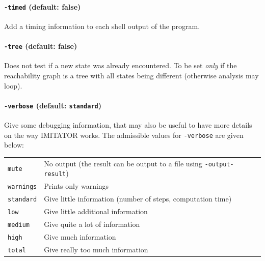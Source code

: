 \documentclass[a4paper,11pt]{report}
\newcommand{\imitator}{\textsf{IMITATOR}}
\newcommand{\styleOption}[1]{\textcolor{optioncolor}{\texttt{#1}}}
\begin{document}
\paragraph{\styleOption{-timed} (default: false)}
Add a timing information to each shell output of the program.



\paragraph{\styleOption{-tree} (default: false)}
Does not test if a new state was already encountered.
To be set \emph{only} if the reachability graph is a tree with all states being different (otherwise analysis may loop). 




\paragraph{\styleOption{-verbose} (default: \styleOption{standard})}

Give some debugging information, that may also be useful to have more details on the way \imitator{} works.
The admissible values for \styleOption{-verbose} are given below:

\begin{tabular}{@{} l @{\ \ } l}
 \styleOption{mute} & No output (the result can be output to a file using \styleOption{-output-result}) \\
 \styleOption{warnings} & Prints only warnings \\
 \styleOption{standard} & Give little information (number of steps, computation time)\\
 \styleOption{low} & Give little additional information\\
 \styleOption{medium} & Give quite a lot of information\\
 \styleOption{high} & Give much information\\
 \styleOption{total} & Give really too much information\\
\end{tabular}


\end{document}
